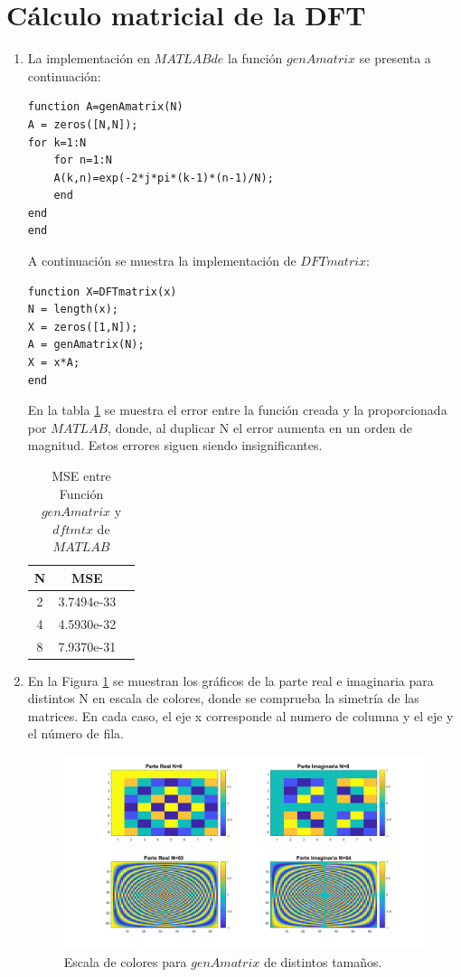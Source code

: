 \documentclass[letterpaper,onecolumn,10pt,journal,final]{IEEEtran}
\begin{document}
\section{Cálculo matricial de la DFT}
\begin{enumerate}[1)]
    \item %

La implementación en $MATLABde$ la función $genAmatrix$ se presenta a continuación:
\begin{lstlisting}
function A=genAmatrix(N)
A = zeros([N,N]);
for k=1:N
    for n=1:N
    A(k,n)=exp(-2*j*pi*(k-1)*(n-1)/N);
    end
end
end
\end{lstlisting}
A continuación se muestra la implementación de $DFTmatrix$:
\begin{lstlisting}
function X=DFTmatrix(x)
N = length(x);
X = zeros([1,N]);
A = genAmatrix(N);
X = x*A;
end
\end{lstlisting}
En la tabla \ref{tab:2} se muestra el error entre la función creada y la proporcionada por $MATLAB$, donde, al duplicar N el error aumenta en un orden de magnitud. Estos errores siguen siendo insignificantes. 
\begin{table}[H]
        \centering
        \begin{tabular}{|c|c|c|}
        \hline
            N & MSE        \\ \hline
            2 & 3.7494e-33 \\
            4 & 4.5930e-32 \\
            8 & 7.9370e-31 \\\hline
        \end{tabular}
        \caption{MSE entre Función $genAmatrix$ y $dftmtx$ de $MATLAB$}
        \label{tab:2}
\end{table}
    \item %
En la Figura \ref{V2} se muestran los gráficos de la parte real e imaginaria para distintos N en escala de colores, donde se comprueba la simetría de las matrices. En cada caso, el eje x corresponde al numero de columna y el eje y el número de fila.

\begin{figure}[H]
\centering
\includegraphics[width=1 \linewidth]{Figuras/V2.png}
\caption{Escala de colores para $genAmatrix$ de distintos tamaños.}
\label{V2}
\end{figure}
    

\end{enumerate}
\end{document}
